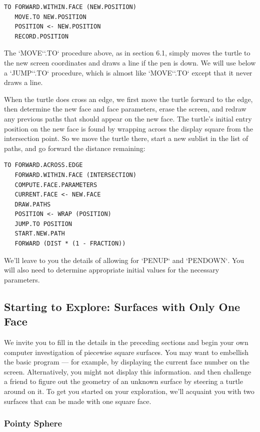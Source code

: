 \documentclass{book}
\begin{document}
\begin{verbatim}
TO FORWARD.WITHIN.FACE (NEW.POSITION)
   MOVE.TO NEW.POSITION
   POSITION <- NEW.POSITION
   RECORD.POSITION
\end{verbatim}
The \textsc{`MOVE`}\textsc{`.TO`} procedure above, as in section 6.1, simply moves the turtle
to the new screen coordinates and draws a line if the pen is down. We
will use below a \textsc{`JUMP`}\textsc{`.TO`} procedure, which is almost like \textsc{`MOVE`}\textsc{`.TO`} except
that it never draws a line.

When the turtle does cross an edge, we first move the turtle forward
to the edge, then determine the new face and face parameters, erase
the screen, and redraw any previous paths that should appear on the
new face. The turtle's initial entry position on the new face is found by
wrapping across the display square from the intersection point. So we
move the turtle there, start a new sublist in the list of paths, and go
forward the distance remaining:

\begin{verbatim}
TO FORWARD.ACROSS.EDGE
   FORWARD.WITHIN.FACE (INTERSECTION)
   COMPUTE.FACE.PARAMETERS
   CURRENT.FACE <- NEW.FACE
   DRAW.PATHS
   POSITION <- WRAP (POSITION)
   JUMP.TO POSITION
   START.NEW.PATH
   FORWARD (DIST * (1 - FRACTION))
\end{verbatim}
We'll leave to you the details of allowing for \textsc{`PENUP`} and \textsc{`PENDOWN`}. You
will also need to determine appropriate initial values for the necessary
parameters.

\subsection{Starting to Explore: Surfaces with Only One Face}

We invite you to fill in the details in the preceding sections and begin
your own computer investigation of piecewise square surfaces. You may
want to embellish the basic program --- for example, by displaying the
current face number on the screen. Alternatively, you might not display
this information. and then challenge a friend to figure out the geometry
of an unknown surface by steering a turtle around on it. To get you
started on your exploration, we'll acquaint you with two surfaces that
can be made with one square face.

\subsubsection{Pointy Sphere}
\end{document}
